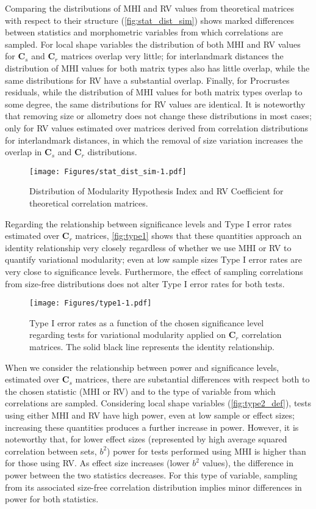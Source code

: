 \documentclass[12pt,twoside]{report}
\begin{document}
Comparing the distributions of MHI and RV values from theoretical
matrices with respect to their structure (\autoref{fig:stat_dist_sim})
shows marked differences between statistics and morphometric variables
from which correlations are sampled. For local shape variables the
distribution of both MHI and RV values for $\mathbf{C}_s$ and
$\mathbf{C}_r$ matrices overlap very little; for interlandmark distances
the distribution of MHI values for both matrix types also has little
overlap, while the same distributions for RV have a substantial overlap.
Finally, for Procrustes residuals, while the distribution of MHI values
for both matrix types overlap to some degree, the same distributions for
RV values are identical. It is noteworthy that removing size or
allometry does not change these distributions in most cases; only for RV
values estimated over matrices derived from correlation distributions
for interlandmark distances, in which the removal of size variation
increases the overlap in $\mathbf{C}_s$ and $\mathbf{C}_r$
distributions.

\begin{figure}[htbp]
\centering
\texttt{[image: Figures/stat\_dist\_sim-1.pdf]}
\caption{Distribution of Modularity Hypothesis Index and RV Coefficient
for theoretical correlation matrices. \label{fig:stat_dist_sim}}
\end{figure}

Regarding the relationship between significance levels and Type I error
rates estimated over $\mathbf{C}_r$ matrices, \autoref{fig:type1} shows
that these quantities approach an identity relationship very closely
regardless of whether we use MHI or RV to quantify variational
modularity; even at low sample sizes Type I error rates are very close
to significance levels. Furthermore, the effect of sampling correlations
from size-free distributions does not alter Type I error rates for both
tests.

\begin{figure}[htbp]
\centering
\texttt{[image: Figures/type1-1.pdf]}
\caption{Type I error rates as a function of the chosen significance
level regarding tests for variational modularity applied on
$\mathbf{C}_r$ correlation matrices. The solid black line represents the
identity relationship. \label{fig:type1}}
\end{figure}

When we consider the relationship between power and significance levels,
estimated over $\mathbf{C}_s$ matrices, there are substantial
differences with respect both to the chosen statistic (MHI or RV) and to
the type of variable from which correlations are sampled. Considering
local shape variables (\autoref{fig:type2_def}), tests using either MHI
and RV have high power, even at low sample or effect sizes; increasing
these quantities produces a further increase in power. However, it is
noteworthy that, for lower effect sizes (represented by high average
squared correlation between sets, $b^2$) power for tests performed using
MHI is higher than for those using RV. As effect size increases (lower
$b^2$ values), the difference in power between the two statistics
decreases. For this type of variable, sampling from its associated
size-free correlation distribution implies minor differences in power
for both statistics.
\end{document}
